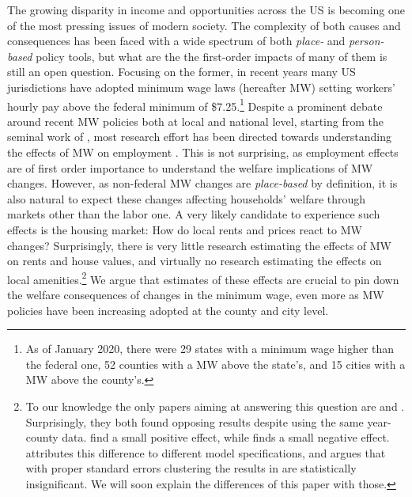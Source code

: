 
The growing disparity in income and opportunities across the US is becoming one of the most pressing issues of modern society. The complexity of both causes and consequences has been faced with a wide spectrum of both \textit{place-} and \textit{person-based} policy tools, but what are the the first-order impacts of many of them is still an open question. Focusing on the former, in recent years many US jurisdictions have adopted minimum wage laws (hereafter MW) setting workers' hourly pay above the federal minimum of \$7.25.\footnote{As of January 2020, there were 29 states with a minimum wage higher than the federal one, 52 counties with a MW above the state's, and 15 cities with a MW above the county's.} Despite a prominent debate around recent MW policies both at local and national level, starting from the seminal work of \textcite{card2000minimum}, most research effort has been directed towards understanding the effects of MW on employment \parencite[e.g,][]{dube2010minimum, neumark2006minimum, cengiz2019effect}. This is not surprising, as employment effects are of first order importance to understand the welfare implications of MW changes. However, as non-federal MW changes are \textit{place-based} by definition, it is also natural to expect these changes affecting households' welfare through markets other than the labor one. A very likely candidate to experience such effects is the housing market: How do local rents and prices react to MW changes? Surprisingly, there is very little research estimating the effects of MW on rents and house values, and virtually no research estimating the effects on local amenities.\footnote{To our knowledge the only papers aiming at answering this question are \textcite{yamagishi2019minimum} and \textcite{tidemann2018mw}. Surprisingly, they both found opposing results despite using the same year-county data. \textcite{yamagishi2019minimum} find a small positive effect, while \textcite{tidemann2018mw} finds a small negative effect. \textcite{yamagishi2019minimum} attributes this difference to different model specifications, and argues that with proper standard errors clustering the results in \textcite{tidemann2018mw} are statistically insignificant. We will soon explain the differences of this paper with those.} We argue that estimates of these effects are crucial to pin down the welfare consequences of changes in the minimum wage, even more as MW policies have been increasing adopted at the county and city level.


